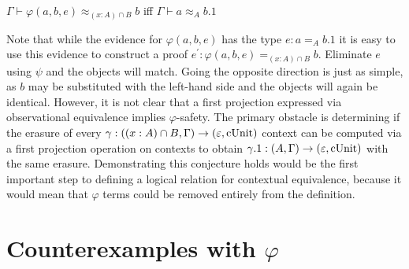 \begin{conjecture}
    $\Gamma \vdash \varphi(a, b, e) \approx_{(x : A) \cap B} b$ iff $\Gamma \vdash a \approx_{A} b.1$
\end{conjecture}

Note that while the evidence for $\varphi(a, b, e)$ has the type $e : a =_A b.1$ it is easy to use this evidence to construct a proof $e^\prime : \varphi(a, b, e) =_{(x : A) \cap B} b$.
Eliminate $e$ using $\psi$ and the objects will match.
Going the opposite direction is just as simple, as $b$ may be substituted with the left-hand side and the objects will again be identical.
However, it is not clear that a first projection expressed via observational equivalence implies $\varphi$-safety.
The primary obstacle is determining if the erasure of every $\gamma : ((x : A) \cap B, \Gamma) \to (\varepsilon, \textnormal{cUnit})$ context can be computed via a first projection operation on contexts to obtain $\gamma.1 : (A, \Gamma) \to (\varepsilon, \textnormal{cUnit})$ with the same erasure.
Demonstrating this conjecture holds would be the first important step to defining a logical relation for contextual equivalence, because it would mean that $\varphi$ terms could be removed entirely from the definition.

\section{Counterexamples with \texorpdfstring{$\varphi$}{Phi}}

